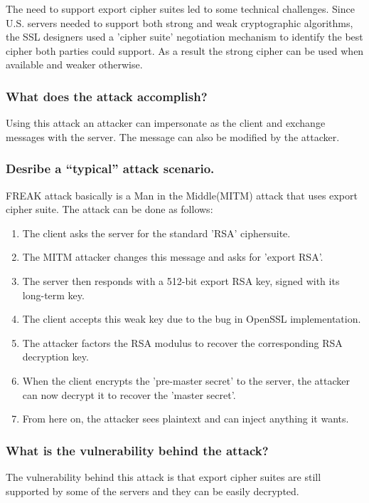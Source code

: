 \documentclass{article}
\begin{document}
The need to support export cipher suites led to some technical challenges. Since U.S. servers needed to support both strong and weak cryptographic algorithms, the SSL designers used a 'cipher suite' negotiation mechanism to identify the best cipher both parties could support. As a result the strong cipher can be used when available and weaker otherwise.

\subsubsection{What does the attack accomplish?}
\indent \indent Using this attack an attacker can impersonate as the client and exchange messages with the server. The message can also be modified by the attacker.

\subsubsection{Desribe a “typical” attack scenario.}
\indent \indent FREAK attack basically is a  Man in the Middle(MITM) attack that uses export cipher suite. The attack can be done as follows: \\
\begin{enumerate}
 \item The client asks the server for the standard 'RSA' ciphersuite.
 \item The MITM attacker changes this message and asks for 'export RSA'.
 \item The server then responds with a 512-bit export RSA key, signed with its long-term key.
 \item The client accepts this weak key due to the bug in OpenSSL implementation.
 \item The attacker factors the RSA modulus to recover the corresponding RSA decryption key.
 \item When the client encrypts the 'pre-master secret' to the server, the attacker can now decrypt it to recover the 'master secret'.
 \item From here on, the attacker sees plaintext and can inject anything it wants.
\end{enumerate}

\subsubsection{What is the vulnerability behind the attack?}
\indent \indent The vulnerability behind this attack is that export cipher suites are still supported by some of the servers and they can be easily decrypted.
\end{document}
